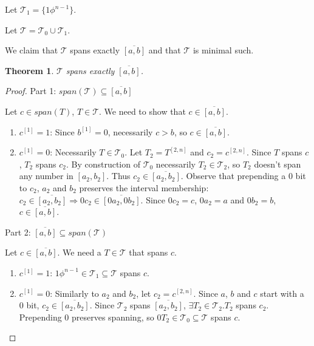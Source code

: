 \documentclass{article}
\theoremstyle{plain}
\newtheorem{theorem}{Theorem}[subsection]
\theoremstyle{definition}
\newcommand{\interval}[2]{[#1, #2]}
\newcommand{\compl}[1]{\overline{#1}}
\newcommand{\finterval}[2]{\compl{\interval{#1}{#2}}}
\newcommand{\bit}[2]{#1^{[#2]}}
\newcommand{\bits}[3]{#1^{\interval{#2}{#3}}}
\begin{document}
Let $\mathcal{T}_1 = \{ 1 \phi^{n-1} \}$.

Let $\mathcal{T} = \mathcal{T}_0 \cup \mathcal{T}_1$.

We claim that $\mathcal{T}$ spans exactly $\finterval{a}{b}$
and that $\mathcal{T}$ is minimal such. %

\begin{theorem}
$\mathcal{T}$ spans exactly $\finterval{a}{b}$.
\end{theorem}

\begin{proof}
Part 1: $span(\mathcal{T}) \subseteq \finterval{a}{b}$

Let $c \in span(T)$, $T \in \mathcal{T}$.
We need to show that $c \in \finterval{a}{b}$.

\begin{enumerate}
\item $\bit{c}{1} = 1$: Since $\bit{b}{1} = 0$, necessarily $c > b$, so $c \in \finterval{a}{b}$.
\item $\bit{c}{1} = 0$: Necessarily $T \in \mathcal{T}_0$.
Let $T_2 = \bits{T}{2}{n}$ and $c_2 = \bits{c}{2}{n}$.
Since $T$ spans $c$, $T_2$ spans $c_2$.
By construction of $\mathcal{T}_0$ necessarily $T_2 \in \mathcal{T}_2$,
so $T_2$ doesn't span any number in $\interval{a_2}{b_2}$.
Thus $c_2 \in \finterval{a_2}{b_2}$.
Observe that prepending a $0$ bit to $c_2$, $a_2$ and $b_2$ preserves the interval membership:
$c_2 \in \finterval{a_2}{b_2} \Rightarrow 0 c_2 \in \finterval{0 a_2}{0 b_2}$.
Since $0 c_2 = c$, $0 a_2 = a$ and $0 b_2 = b$,
$c \in \finterval{a}{b}$.
\end{enumerate}

Part 2: $\finterval{a}{b} \subseteq span(\mathcal{T})$

Let $c \in \finterval{a}{b}$.
We need a $T \in \mathcal{T}$ that spans $c$.

\begin{enumerate}
\item $\bit{c}{1} = 1$: $1 \phi^{n-1} \in \mathcal{T}_1 \subseteq \mathcal{T}$ spans $c$.
\item $\bit{c}{1} = 0$:
Similarly to $a_2$ and $b_2$, let $c_2 = \bits{c}{2}{n}$.
Since $a$, $b$ and $c$ start with a $0$ bit,
$c_2 \in \finterval{a_2}{b_2}$.
Since $\mathcal{T}_2$ spans $\finterval{a_2}{b_2}$,
$\exists T_2 \in \mathcal{T}_2 . T_2$ spans $c_2$.
Prepending $0$ preserves spanning,
so $0 T_2 \in \mathcal{T}_0 \subseteq \mathcal{T}$ spans $c$.
\end{enumerate}
\end{proof}
\end{document}
